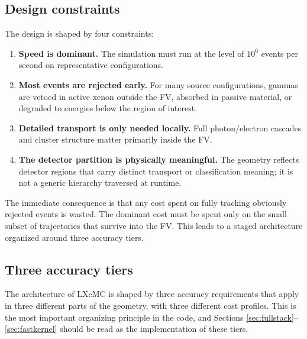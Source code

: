 \documentclass[11pt]{article}
\begin{document}
\subsection{Design constraints}
\label{sec:constraints}

The design is shaped by four constraints:
\begin{enumerate}[label=\arabic*.]
\item \textbf{Speed is dominant.} The simulation must run at the level of
$10^6$ events per second on representative configurations.
\item \textbf{Most events are rejected early.} For many source configurations,
gammas are vetoed in active xenon outside the FV, absorbed in passive material,
or degraded to energies below the region of interest.
\item \textbf{Detailed transport is only needed locally.} Full
photon/electron cascades and cluster structure matter primarily inside the FV.
\item \textbf{The detector partition is physically meaningful.} The geometry
reflects detector regions that carry distinct transport or classification
meaning; it is not a generic hierarchy traversed at runtime.
\end{enumerate}

The immediate consequence is that any cost spent on fully tracking obviously
rejected events is wasted. The dominant cost must be spent only on the small
subset of trajectories that survive into the FV. This leads to a staged
architecture organized around three accuracy tiers.

\subsection{Three accuracy tiers}
\label{sec:tiers}

The architecture of LXeMC is shaped by three accuracy requirements that apply
in three different parts of the geometry, with three different cost profiles.
This is the most important organizing principle in the code, and Sections
\ref{sec:fullstack}--\ref{sec:fastkernel} should be read as the implementation
of these tiers.
\end{document}
